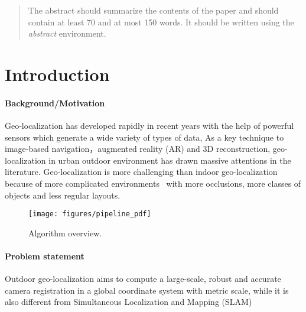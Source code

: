 
\begin{abstract}
The abstract should summarize the contents of the paper and should
contain at least 70 and at most 150 words. It should be written using the
\emph{abstract} environment.
\end{abstract}
%
%
%
%
\section{Introduction}
%
\paragraph{Background/Motivation}
Geo-localization has developed rapidly in recent years with the help of powerful sensors which generate a wide variety of types of data,  
As a key technique to image-based navigation，augmented reality (AR) and 3D reconstruction, geo-localization in urban outdoor environment has drawn massive attentions in the literature.
%
Geo-localization is more challenging than indoor geo-localization because of more complicated environments~\cite{Arth2015a} with more occlusions, more classes of objects and less regular layouts. 
 \begin{figure*}[!tp]
 	\centering
 	\vspace{2.0cm}
 	\texttt{[image: figures/pipeline\_pdf]}
 	\caption{Algorithm overview. }
 	\label{fig:overview}
 \end{figure*}
%
\paragraph{Problem statement}
Outdoor geo-localization aims to compute a large-scale, robust and accurate camera registration in a global coordinate system with metric scale, while it is also different from Simultaneous Localization and Mapping (SLAM) 
%
